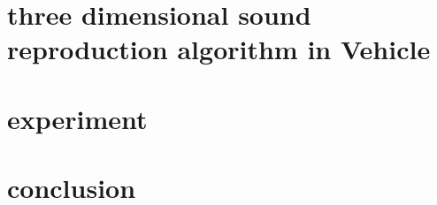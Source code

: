 \documentclass[runningheads,a4paper]{llncs}
\begin{document}
\section{three dimensional sound reproduction algorithm in Vehicle}\label{sec:algorithm}

\section{experiment}\label{sec:experiment}

\section{conclusion}\label{sec:conclusion}

\label{bib:bibliography}



\end{document}
